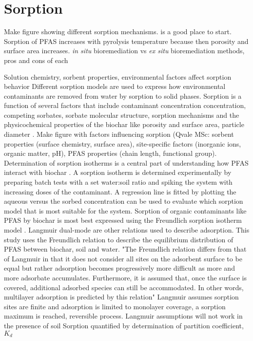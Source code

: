 
\section{Sorption}
Make figure showing different sorption mechanisms.\citep{Li2019} is a good place to start. Sorption of PFAS increases with pyrolysis temperature because then porosity and surface area increases.  \textit{in situ} bioremediation vs \textit{ex situ} bioremediation methods, pros and cons of each

Solution chemistry, sorbent properties, environmental factors affect sorption behavior \citep{du2014adsorption}
Different sorption models are used to express how environmental contaminants are removed from water by sorption to solid phases. Sorption is a function of several factors that include contaminant concentration concentration, competing sorbates, sorbate molecular structure, sorption mechanisms and the physicochemical properties of the biochar like porosity and surface area, particle diameter \citep{Li2019,du2014adsorption}. Make figure with factors influencing sorption (Qvale MSc: sorbent properties (surface chemistry, surface area), site-specific factors (inorganic ions, organic matter, pH), PFAS properties (chain length, functional group). Determination of sorption isotherms is a central part of understanding how PFAS interact with biochar \citep{Li2019}. A sorption isotherm is determined experimentally by preparing batch tests with a set water:soil ratio and spiking the system with increasing doses of the contaminant. A regression line is fitted by plotting the aqueous versus the sorbed concentration can be used to evaluate which sorption model that is most suitable for the system. Sorption of organic contaminants like PFAS by biochar is most best expressed using the Freundlich sorption isotherm model . Langmuir dual-mode are other relations used to describe adsorption. This study uses the Freundlich relation to describe the equilibrium distribution of PFAS between biochar, soil and water. "The Freundlich relation differs from that of Langmuir in that it does not consider all sites on the adsorbent surface to be equal but rather adsorption becomes progressively more difficult as more and more adsorbate accumulates. Furthermore, it is assumed that, once the surface is covered, additional adsorbed species can still be accommodated. In other words, multilayer adsorption is predicted by this relation" \citep{vanloon2017Ch14}
Langmuir assumes sorption sites are finite and adsorption is limited to monolayer coverage, a sorption maximum is reached, reversible process. Langmuir assumptions will not work in the presence of soil
Sorption quantified by determination of partition coefficient, $K_d$

